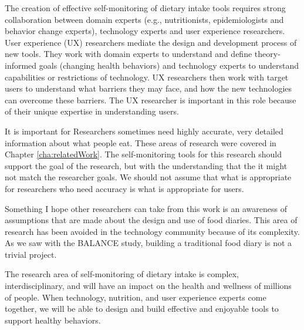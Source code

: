 The creation of effective self-monitoring of dietary intake tools requires strong collaboration between domain experts (e.g., nutritionists, epidemiologists and behavior change experts), technology experts and user experience researchers. User experience (UX) researchers mediate the design and development process of new tools. They work with domain experts to understand and define theory-informed goals (changing health behaviors) and technology experts to understand capabilities or restrictions of technology. UX researchers then work with target users to understand what barriers they may face, and how the new technologies can overcome these barriers. The UX researcher is important in this role because of their unique expertise in understanding users. 


It is important for Researchers sometimes need highly accurate, very detailed information about what people eat. These areas of research were covered in Chapter \ref{cha:relatedWork}. The self-monitoring tools for this research should support the goal of the research, but with the understanding that the it might not match the researcher goals. We should not  assume that what is appropriate for researchers who need accuracy is what is appropriate for users. 

Something I hope other researchers can take from this work is an awareness of assumptions that are made about the design and use of food diaries. This area of research has been avoided in the technology community because of its complexity. As we saw with the BALANCE study, building a traditional food diary is not a trivial project. 


The research area of self-monitoring of dietary intake is complex, interdisciplinary, and will have an impact on the health and wellness of millions of people. When technology, nutrition, and user experience experts come together, we will be able to design and build effective and enjoyable tools to support healthy behaviors. 

